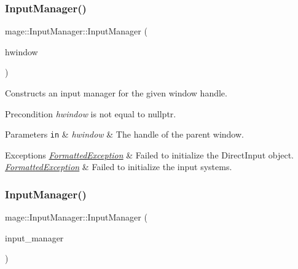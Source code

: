 \subsubsection{\texorpdfstring{Input\+Manager()}{InputManager()}\hspace{0.1cm}{\footnotesize\ttfamily [1/3]}}
{\footnotesize\ttfamily mage\+::\+Input\+Manager\+::\+Input\+Manager (\begin{DoxyParamCaption}\item[{H\+W\+ND}]{hwindow }\end{DoxyParamCaption})\hspace{0.3cm}{\ttfamily [explicit]}}

Constructs an input manager for the given window handle.

\begin{DoxyPrecond}{Precondition}
{\itshape hwindow} is not equal to {\ttfamily nullptr}. 
\end{DoxyPrecond}

\begin{DoxyParams}[1]{Parameters}
\mbox{\tt in}  & {\em hwindow} & The handle of the parent window. \\
\hline
\end{DoxyParams}

\begin{DoxyExceptions}{Exceptions}
{\em \hyperlink{structmage_1_1_formatted_exception}{Formatted\+Exception}} & Failed to initialize the Direct\+Input object. \\
\hline
{\em \hyperlink{structmage_1_1_formatted_exception}{Formatted\+Exception}} & Failed to initialize the input systems. \\
\hline
\end{DoxyExceptions}
\hypertarget{classmage_1_1_input_manager_a68503617f418bf270dc39bb18019b46d}{}\label{classmage_1_1_input_manager_a68503617f418bf270dc39bb18019b46d} 
\subsubsection{\texorpdfstring{Input\+Manager()}{InputManager()}\hspace{0.1cm}{\footnotesize\ttfamily [2/3]}}
{\footnotesize\ttfamily mage\+::\+Input\+Manager\+::\+Input\+Manager (\begin{DoxyParamCaption}\item[{const \hyperlink{classmage_1_1_input_manager}{Input\+Manager} \&}]{input\+\_\+manager }\end{DoxyParamCaption})\hspace{0.3cm}{\ttfamily [delete]}}

